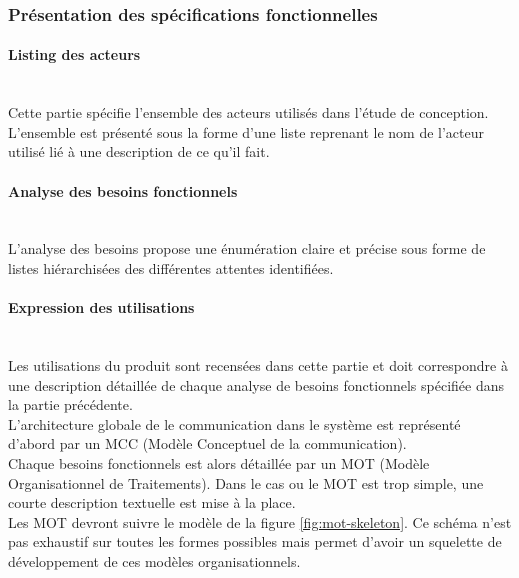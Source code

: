 \subsubsection{Présentation des spécifications fonctionnelles}
\paragraph{Listing des acteurs}
~\\
Cette partie spécifie l'ensemble des acteurs utilisés dans l'étude de conception. \\

L'ensemble est présenté sous la forme d'une liste reprenant le nom de l'acteur
utilisé lié à une description de ce qu'il fait. \\

\paragraph{Analyse des besoins fonctionnels}
~\\
L'analyse des besoins propose une énumération claire et précise sous forme de
listes hiérarchisées des différentes attentes identifiées. \\

\paragraph{Expression des utilisations}
~\\
Les utilisations du produit sont recensées dans cette partie et doit
correspondre à une description détaillée de chaque analyse de besoins
fonctionnels spécifiée dans la partie précédente. \\

L'architecture globale de le communication dans le système est représenté
d'abord par un MCC (Modèle Conceptuel de la communication). \\

Chaque besoins fonctionnels est alors détaillée par un MOT (Modèle
Organisationnel de Traitements). Dans le cas ou le MOT est trop simple, une
courte description textuelle est mise à la place. \\

Les MOT devront suivre le modèle de la figure \ref{fig:mot-skeleton}. Ce schéma
n'est pas exhaustif sur toutes les formes possibles mais permet d'avoir un
squelette de développement de ces modèles organisationnels. \\

